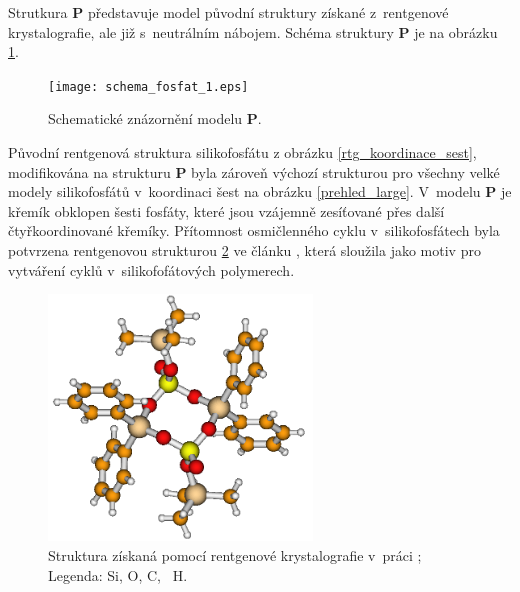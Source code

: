 \documentclass[
digital, %
table,   %
lof,     %
lot,     %
oneside,
]{fithesis3}
\begin{document}
Strutkura \textbf{P} představuje model původní struktury získané z~rentgenové krystalografie, ale již s~neutrálním nábojem. Schéma struktury \textbf{P} je na obrázku \ref{schema_fosfat}.
\begin{figure}\begin{center}\texttt{[image: schema\_fosfat\_1.eps]}
\caption{Schematické znázornění modelu \textbf{P}.}\label{schema_fosfat}
\end{center}\end{figure}
Původní rentgenová struktura silikofosfátu z obrázku \ref{rtg_koordinace_sest}, modifikována na strukturu \textbf{P} byla zároveň výchozí strukturou pro všechny velké modely silikofosfátů v~koordinaci šest na obrázku  \ref{prehled_large}. V~modelu \textbf{P} je křemík obklopen šesti fosfáty, které jsou vzájemně zesíťované přes další čtyřkoordinované křemíky. Přítomnost osmičlenného cyklu v~silikofosfátech byla potvrzena rentgenovou strukturou \ref{rtg_4} ve článku \cite{rtg_4_pinkas}, která sloužila jako motiv pro vytváření cyklů v~silikofofátových polymerech.
\begin{figure}
\begin{center}
\includegraphics[width=7cm]{rtg_4_kruh_samotne.png}
\caption{Struktura \ce{[(Ph2Si{O2P(O)OSiMe3})2]} získaná pomocí rentgenové krystalografie v~práci \cite{rtg_4_pinkas};  Legenda:  Si,  O,  C, ~H.}
\label{rtg_4}
\end{center}
\end{figure}
\end{document}
